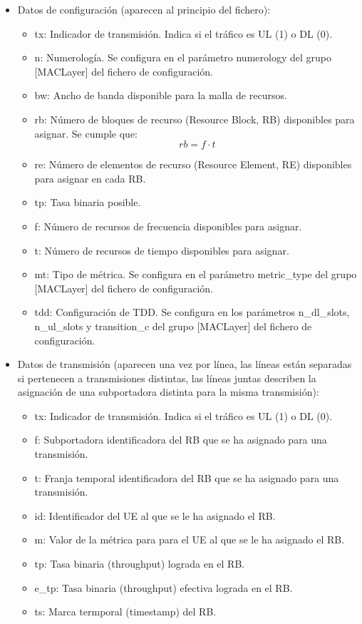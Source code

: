 \documentclass[12pt]{report} %
\begin{document}
\begin{itemize}

\item {
Datos de configuración (aparecen al principio del fichero):
\begin{itemize}
\item tx: Indicador de transmisión. Indica si el tráfico es UL (1) o DL (0).
\item n: Numerología. Se configura en el parámetro numerology del grupo [MACLayer] del fichero de configuración.
\item bw: Ancho de banda disponible para la malla de recursos.
\item rb: Número de bloques de recurso (Resource Block, RB) disponibles para asignar. Se cumple que:
$$rb = f \cdot t$$
\item re: Número de elementos de recurso (Resource Element, RE) disponibles para asignar en cada RB.
\item tp: Tasa binaria posible.
\item f: Número de recursos de frecuencia disponibles para asignar.
\item t: Número de recursos de tiempo disponibles para asignar.
\item mt: Tipo de métrica. Se configura en el parámetro metric\_type del grupo [MACLayer] del fichero de configuración.
\item tdd: Configuración de TDD. Se configura en los parámetros n\_dl\_slots, n\_ul\_slots y transition\_c del grupo [MACLayer] del fichero de configuración.
\end{itemize}
}

\item {
Datos de transmisión (aparecen una vez por línea, las líneas están separadas si pertenecen a transmisiones distintas, las líneas juntas describen la asignación de una subportadora distinta para la misma transmisión):
\begin{itemize}
\item tx: Indicador de transmisión. Indica si el tráfico es UL (1) o DL (0).
\item f: Subportadora identificadora del RB que se ha asignado para una transmisión.
\item t: Franja temporal identificadora del RB que se ha asignado para una transmisión.
\item id: Identificador del UE al que se le ha asignado el RB.
\item m: Valor de la métrica para para el UE al que se le ha asignado el RB.
\item tp: Tasa binaria (throughput) lograda en el RB.
\item e\_tp: Tasa binaria (throughput) efectiva lograda en el RB.
\item ts: Marca termporal (timestamp) del RB.
\end{itemize}
}
\end{itemize}
\end{document}
